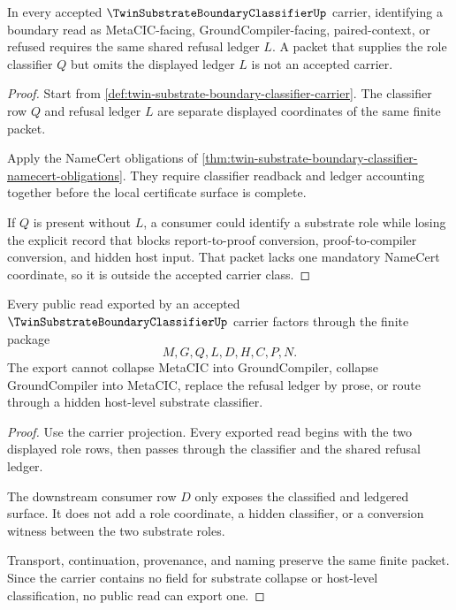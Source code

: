 \begin{theorem}
\label{thm:twin-substrate-boundary-classifier-refusal-discipline}
In every accepted $\TwinSubstrateBoundaryClassifierUp$ carrier, identifying a boundary read as MetaCIC-facing, GroundCompiler-facing, paired-context, or refused requires the same shared refusal ledger $L$. A packet that supplies the role classifier $Q$ but omits the displayed ledger $L$ is not an accepted carrier.
\end{theorem}
\begin{proof}
Start from \autoref{def:twin-substrate-boundary-classifier-carrier}. The classifier row $Q$ and refusal ledger $L$ are separate displayed coordinates of the same finite packet.

Apply the NameCert obligations of \autoref{thm:twin-substrate-boundary-classifier-namecert-obligations}. They require classifier readback and ledger accounting together before the local certificate surface is complete.

If $Q$ is present without $L$, a consumer could identify a substrate role while losing the explicit record that blocks report-to-proof conversion, proof-to-compiler conversion, and hidden host input. That packet lacks one mandatory NameCert coordinate, so it is outside the accepted carrier class.
\end{proof}

\begin{theorem}
\label{thm:twin-substrate-boundary-classifier-nonescape}
Every public read exported by an accepted $\TwinSubstrateBoundaryClassifierUp$ carrier factors through the finite package
$$
M,G,Q,L,D,H,C,P,N .
$$
The export cannot collapse MetaCIC into GroundCompiler, collapse GroundCompiler into MetaCIC, replace the refusal ledger by prose, or route through a hidden host-level substrate classifier.
\end{theorem}
\begin{proof}
Use the carrier projection. Every exported read begins with the two displayed role rows, then passes through the classifier and the shared refusal ledger.

The downstream consumer row $D$ only exposes the classified and ledgered surface. It does not add a role coordinate, a hidden classifier, or a conversion witness between the two substrate roles.

Transport, continuation, provenance, and naming preserve the same finite packet. Since the carrier contains no field for substrate collapse or host-level classification, no public read can export one.
\end{proof}

